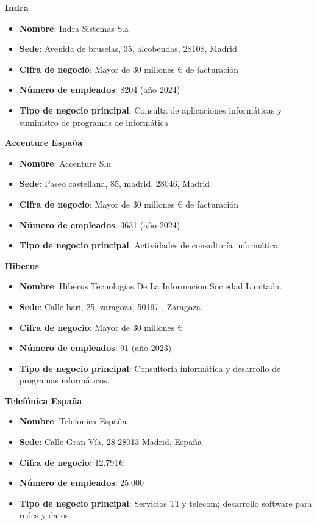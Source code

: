 \documentclass[11.5pt]{article}
\begin{document}
	\noindent\textbf{{\large Indra}}
	
	\begin{itemize}
		\item \textbf{Nombre}: Indra Sistemas S.a
		\item 	\textbf{Sede}: Avenida de bruselas, 35, alcobendas, 28108, Madrid
		\item 	\textbf{Cifra de negocio}: Mayor de 30 millones € de facturación
		\item 	\textbf{Número de empleados}: 8204 (año 2024)
		\item 	\textbf{Tipo de negocio principal}: Consulta de aplicaciones informáticas y suministro de programas de informática
	\end{itemize}
	
	\noindent\textbf{{\large Accenture España}}
	
	\begin{itemize}
		\item \textbf{Nombre}: Accenture Slu
		\item 	\textbf{Sede}: Paseo castellana, 85, madrid, 28046, Madrid
		\item 	\textbf{Cifra de negocio}: Mayor de 30 millones € de facturación
		\item 	\textbf{Número de empleados}: 3631 (año 2024)
		\item 	\textbf{Tipo de negocio principal}: Actividades de consultoría informática
	\end{itemize}
	
	\noindent\textbf{{\large Hiberus}}
	
	\begin{itemize}
		\item \textbf{Nombre}: Hiberus Tecnologias De La Informacion Sociedad Limitada.
		\item 	\textbf{Sede}: Calle bari, 25, zaragoza, 50197-, Zaragoza
		\item 	\textbf{Cifra de negocio}: Mayor de 30 millones €
		\item 	\textbf{Número de empleados}: 91 (año 2023)
		\item 	\textbf{Tipo de negocio principal}: Consultoría informática y desarrollo de programas informáticos.
	\end{itemize}
	
	\noindent\textbf{{\large Telefónica España}}
	
	\begin{itemize}
		\item \textbf{Nombre}: Telefonica España
		\item 	\textbf{Sede}: Calle Gran Vía, 28 28013 Madrid, España
		\item 	\textbf{Cifra de negocio}: 12.791€
		\item 	\textbf{Número de empleados}: 25.000
		\item 	\textbf{Tipo de negocio principal}: Servicios TI y telecom; desarrollo software para redes y datos
	\end{itemize}
	
\end{document}
